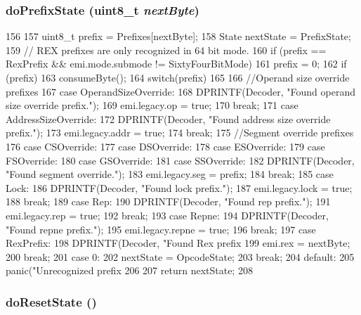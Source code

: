 \hypertarget{classX86ISA_1_1Decoder_a34e20e41a8a8172e08cbf7f09ef390a1}{
\subsubsection[{doPrefixState}]{ doPrefixState (uint8\_\-t {\em nextByte})}}
\label{classX86ISA_1_1Decoder_a34e20e41a8a8172e08cbf7f09ef390a1}



\begin{DoxyCode}
156 {
157     uint8_t prefix = Prefixes[nextByte];
158     State nextState = PrefixState;
159     // REX prefixes are only recognized in 64 bit mode.
160     if (prefix == RexPrefix && emi.mode.submode != SixtyFourBitMode)
161         prefix = 0;
162     if (prefix)
163         consumeByte();
164     switch(prefix)
165     {
166         //Operand size override prefixes
167       case OperandSizeOverride:
168         DPRINTF(Decoder, "Found operand size override prefix.\n");
169         emi.legacy.op = true;
170         break;
171       case AddressSizeOverride:
172         DPRINTF(Decoder, "Found address size override prefix.\n");
173         emi.legacy.addr = true;
174         break;
175         //Segment override prefixes
176       case CSOverride:
177       case DSOverride:
178       case ESOverride:
179       case FSOverride:
180       case GSOverride:
181       case SSOverride:
182         DPRINTF(Decoder, "Found segment override.\n");
183         emi.legacy.seg = prefix;
184         break;
185       case Lock:
186         DPRINTF(Decoder, "Found lock prefix.\n");
187         emi.legacy.lock = true;
188         break;
189       case Rep:
190         DPRINTF(Decoder, "Found rep prefix.\n");
191         emi.legacy.rep = true;
192         break;
193       case Repne:
194         DPRINTF(Decoder, "Found repne prefix.\n");
195         emi.legacy.repne = true;
196         break;
197       case RexPrefix:
198         DPRINTF(Decoder, "Found Rex prefix %
199         emi.rex = nextByte;
200         break;
201       case 0:
202         nextState = OpcodeState;
203         break;
204       default:
205         panic("Unrecognized prefix %
206     }
207     return nextState;
208 }
\end{DoxyCode}
\hypertarget{classX86ISA_1_1Decoder_a3e359a01a10d324b1a5f5931b6aafb41}{
\subsubsection[{doResetState}]{ doResetState ()}}
\label{classX86ISA_1_1Decoder_a3e359a01a10d324b1a5f5931b6aafb41}



